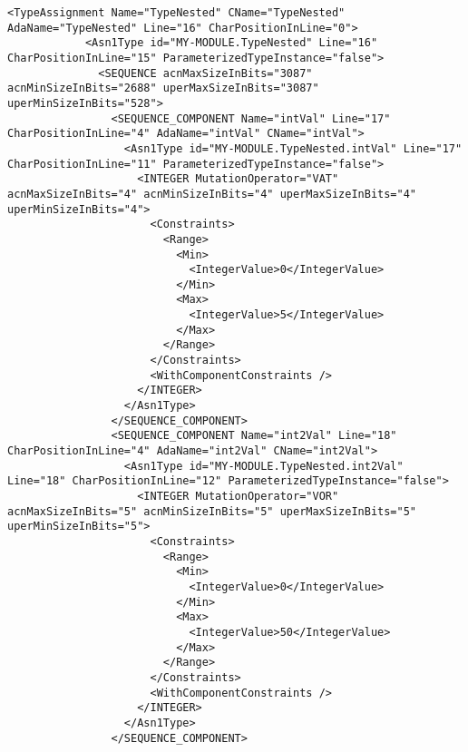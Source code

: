 
\begin{minipage}{15cm}
\begin{lstlisting}[style=CStyle, caption=Portion of an XML ASN1 grammar., label=asnXMLUpdated, mathescape=true]
<TypeAssignment Name="TypeNested" CName="TypeNested" AdaName="TypeNested" Line="16" CharPositionInLine="0">
            <Asn1Type id="MY-MODULE.TypeNested" Line="16" CharPositionInLine="15" ParameterizedTypeInstance="false">
              <SEQUENCE acnMaxSizeInBits="3087" acnMinSizeInBits="2688" uperMaxSizeInBits="3087" uperMinSizeInBits="528">
                <SEQUENCE_COMPONENT Name="intVal" Line="17" CharPositionInLine="4" AdaName="intVal" CName="intVal">
                  <Asn1Type id="MY-MODULE.TypeNested.intVal" Line="17" CharPositionInLine="11" ParameterizedTypeInstance="false">
                    <INTEGER MutationOperator="VAT" acnMaxSizeInBits="4" acnMinSizeInBits="4" uperMaxSizeInBits="4" uperMinSizeInBits="4">
                      <Constraints>
                        <Range>
                          <Min>
                            <IntegerValue>0</IntegerValue>
                          </Min>
                          <Max>
                            <IntegerValue>5</IntegerValue>
                          </Max>
                        </Range>
                      </Constraints>
                      <WithComponentConstraints />
                    </INTEGER>
                  </Asn1Type>
                </SEQUENCE_COMPONENT>
                <SEQUENCE_COMPONENT Name="int2Val" Line="18" CharPositionInLine="4" AdaName="int2Val" CName="int2Val">
                  <Asn1Type id="MY-MODULE.TypeNested.int2Val" Line="18" CharPositionInLine="12" ParameterizedTypeInstance="false">
                    <INTEGER MutationOperator="VOR" acnMaxSizeInBits="5" acnMinSizeInBits="5" uperMaxSizeInBits="5" uperMinSizeInBits="5">
                      <Constraints>
                        <Range>
                          <Min>
                            <IntegerValue>0</IntegerValue>
                          </Min>
                          <Max>
                            <IntegerValue>50</IntegerValue>
                          </Max>
                        </Range>
                      </Constraints>
                      <WithComponentConstraints />
                    </INTEGER>
                  </Asn1Type>
                </SEQUENCE_COMPONENT>
\end{lstlisting}
\end{minipage}

